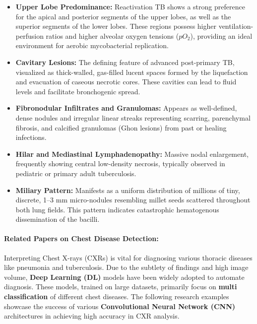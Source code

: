 \begin{itemize}
	\item \textbf{Upper Lobe Predominance:} Reactivation TB shows a strong preference for the apical and posterior segments of the upper lobes, as well as the superior segments of the lower lobes. These regions possess higher ventilation-perfusion ratios and higher alveolar oxygen tensions ($pO_2$), providing an ideal environment for aerobic mycobacterial replication.
	\item \textbf{Cavitary Lesions:} The defining feature of advanced post-primary TB, visualized as thick-walled, gas-filled lucent spaces formed by the liquefaction and evacuation of caseous necrotic cores. These cavities can lead to fluid levels and facilitate bronchogenic spread.
	\item \textbf{Fibronodular Infiltrates and Granulomas:} Appears as well-defined, dense nodules and irregular linear streaks representing scarring, parenchymal fibrosis, and calcified granulomas (Ghon lesions) from past or healing infections.
	\item \textbf{Hilar and Mediastinal Lymphadenopathy:} Massive nodal enlargement, frequently showing central low-density necrosis, typically observed in pediatric or primary adult tuberculosis.
	\item \textbf{Miliary Pattern:} Manifests as a uniform distribution of millions of tiny, discrete, 1--3 mm micro-nodules resembling millet seeds scattered throughout both lung fields. This pattern indicates catastrophic hematogenous dissemination of the bacilli.
\end{itemize}


\paragraph{Related Papers on Chest Disease Detection:}

Interpreting Chest X-rays (CXRs) is vital for diagnosing various thoracic diseases like pneumonia and tuberculosis. Due to the subtlety of findings and high image volume, \textbf{Deep Learning (DL)} models have been widely adopted to automate diagnosis. These models, trained on large datasets, primarily focus on \textbf{multi classification} of different chest diseases. The following research examples showcase the success of various \textbf{Convolutional Neural Network (CNN)} architectures in achieving high accuracy in CXR analysis.

